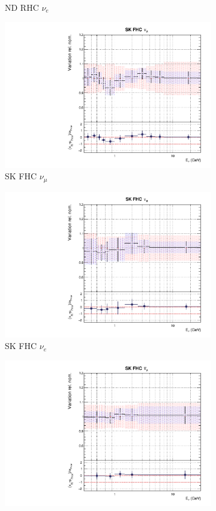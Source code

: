 \begin{figure}[t]
\begin{subfigure}{0.24\textwidth}
  \caption{ND RHC $\nu_e$}
\end{subfigure}
\begin{subfigure}{0.24\textwidth}
  \centering
  \includegraphics[width=0.95\linewidth]{figs/rhcmpdat248flux_8}
  \caption{SK FHC $\nu_{\mu}$}
\end{subfigure}
\begin{subfigure}{0.24\textwidth}
  \centering
  \includegraphics[width=0.95\linewidth]{figs/rhcmpdat248flux_9}
  \caption{SK FHC $\nu_e$}
\end{subfigure}
\begin{subfigure}{0.24\textwidth}
  \centering
  \includegraphics[width=0.95\linewidth]{figs/rhcmpdat248flux_10}

\end{subfigure}
\end{figure}
